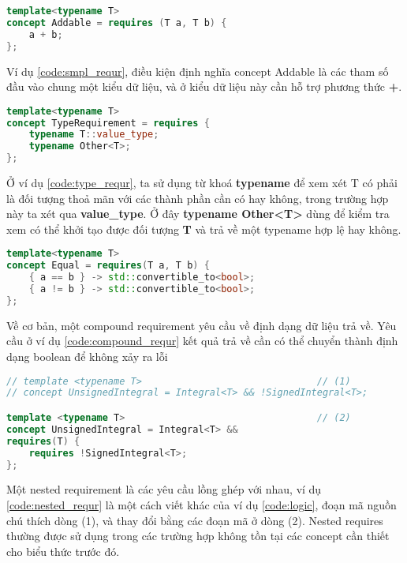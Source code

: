 \begin{lstlisting}[caption={Simple requires\cite{concept-req}},label={code:smpl_requr},language=C++]
template<typename T>
concept Addable = requires (T a, T b) {
    a + b;
};
\end{lstlisting}
Ví dụ \ref{code:smpl_requr}, điều kiện định nghĩa concept Addable là các tham số đầu vào chung một kiểu dữ liệu, và ở kiểu dữ liệu này cần hỗ trợ phương thức \textbf{+}.

\begin{lstlisting}[caption={Type requires\cite{concept-req}},label={code:type_requr},language=C++]
template<typename T>
concept TypeRequirement = requires {
    typename T::value_type;
    typename Other<T>;    
};
\end{lstlisting}

Ở ví dụ \ref{code:type_requr}, ta sử dụng từ khoá \textbf{typename} để xem xét T có phải là đối tượng thoả mãn với các thành phần cần có hay không, trong trường hợp này ta xét qua \textbf{value\_type}. Ở đây \textbf{typename Other<T>} dùng để kiểm tra xem có thể khởi tạo được đối tượng \textbf{T} và trả về một typename hợp lệ hay không.

\begin{lstlisting}[caption={Compound requires\cite{concept-req}},label={code:compound_requr},language=C++]
template<typename T>                                     
concept Equal = requires(T a, T b) {
    { a == b } -> std::convertible_to<bool>;
    { a != b } -> std::convertible_to<bool>;
};
\end{lstlisting}
Về cơ bản, một compound requirement yêu cầu về định dạng dữ liệu trả về. Yêu cầu ở  ví dụ \ref{code:compound_requr} kết quả trả về cần có thể chuyển thành định dạng boolean để không xảy ra lỗi

\begin{lstlisting}[caption={Nested requires\cite{concept-req}},label={code:nested_requr},language=C++]
// template <typename T>                               // (1)
// concept UnsignedIntegral = Integral<T> && !SignedIntegral<T>;

template <typename T>                                  // (2)
concept UnsignedIntegral = Integral<T> &&
requires(T) {
    requires !SignedIntegral<T>;
};
\end{lstlisting}
Một nested requirement là các yêu cầu lồng ghép với nhau, ví dụ \ref{code:nested_requr} là một cách viết khác của ví dụ \ref{code:logic}, đoạn mã nguồn chú thích dòng (1), và thay đổi bằng các đoạn mã ở dòng (2). Nested requires thường được sử dụng trong các trường hợp không tồn tại các concept cần thiết cho biểu thức trước đó.

